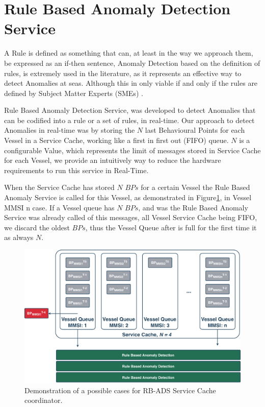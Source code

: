 
\section{Rule Based Anomaly Detection Service}
\label{section: 4 Rule Based Anomaly Detection}
A Rule is defined as something that can, at least in the way we approach them, be expressed as an if-then sentence, \cite{Edlund2006RuleSea-Surveillance}
Anomaly Detection based on the definition of rules, is extremely used in the literature, as it represents an effective way to detect Anomalies at seas. Although this in only viable if and only if the rules are defined by Subject Matter Experts (SMEs) \cite{Boinepalli2014AAlgorithm, Will2011FastProcesses}.

Rule Based Anomaly Detection Service, was developed to detect Anomalies that can be codified into a rule or a set of rules, in real-time. 
Our approach to detect Anomalies in real-time was by storing the $N$ last Behavioural Points for each Vessel in a Service Cache, working like a first in first out (FIFO) queue. $N$ is a configurable Value, which represents the limit of messages stored in Service Cache for each Vessel, we provide an intuitively way to reduce the hardware requirements to run this service in Real-Time.

When the Service Cache has stored $N$ $BPs$ for a certain Vessel the Rule Based Anomaly Service is called for this Vessel, as demonstrated in Figure\ref{fig: RB-ADS}, in Vessel MMSI n case.
If a Vessel queue has $N$ $BPs$, and was the Rule Based Anomaly Service was already called of this messages, all Vessel Service Cache being FIFO, we discard the oldest $BPs$, thus the Vessel Queue after is full for the first time it as always $N$.

\begin{figure}[H]
\centering
\includegraphics[scale = .36]{figures/Ch4/RB-ADS.pdf}
\caption{Demonstration of a possible cases for RB-ADS Service Cache coordinator.}
\label{fig: RB-ADS}
\end{figure}

